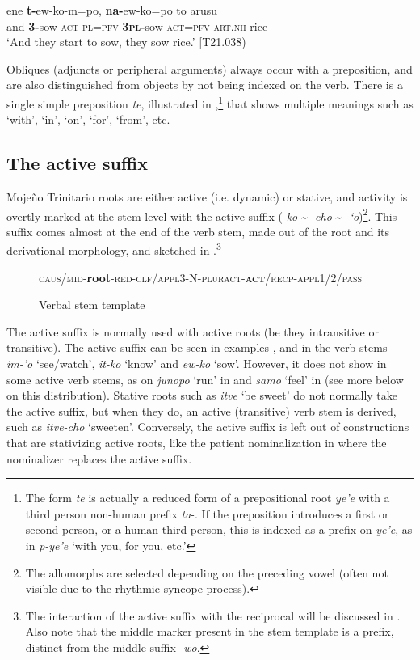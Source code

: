\documentclass[output=paper]{langscibook}
\begin{document}
\ea
\label{ex:Rose:6}
\gll ene \textbf{t-}ew-ko-m=po, \textbf{na-}ew-ko=po to arusu\\
and \textbf{3-}sow-\textsc{act-pl=pfv} \textbf{\textsc{3pl-}}sow-\textsc{act=pfv} \textsc{art.nh} rice\\
\glt ‘And they start to sow, they sow rice.’ [T21.038)
\z


Obliques (adjuncts or peripheral arguments) always occur with a preposition, and are also distinguished from objects by not being indexed on the verb. There is a single simple preposition \textit{te}, illustrated in ,\footnote{The form \textit{te} is actually a reduced form of a prepositional root \textit{ye’e} with a third person non-human prefix \textit{ta}-. If the preposition introduces a first or second person, or a human third person, this is indexed as a prefix on \textit{ye’e}, as in \textit{p-ye’e} ‘with you, for you, etc.’} that shows multiple meanings such as ‘with’, ‘in’, ‘on’, ‘for’, ‘from’, etc.


\subsection{The active suffix}
\label{sec:Rose:2.4}

Mojeño Trinitario roots are either active (i.e. dynamic) or stative, and activity is overtly marked at the stem level with the active suffix (-\textit{ko} {\textasciitilde} -\textit{cho} {\textasciitilde} \nobreakdash-\textit{`o})\footnote{The allomorphs are selected depending on the preceding vowel (often not visible due to the rhythmic syncope process).}. This suffix comes almost at the end of the verb stem, made out of the root and its derivational morphology, and sketched in .\footnote{\textrm{The interaction of the active suffix with the reciprocal will be discussed in . Also note that the middle marker present in the stem template is a prefix, distinct from the middle suffix -}\textrm{\textit{wo}}.}


\begin{figure}
\caption{\label{fig:Rose:2}Verbal stem template}

\textsc{caus/mid}-\textbf{root}-\textsc{red-clf/appl3-}N\textsc{-pluract-}\textbf{\textsc{act}}\textsc{/recp-appl1/2/pass}
\end{figure}

The active suffix is normally used with active roots (be they intransitive or transitive). The active suffix can be seen in examples ,  and  in the verb stems \textit{im-'o} ‘see/watch’, \textit{it-ko} ‘know’ and \textit{ew-ko} ‘sow’. However, it does not show in some active verb stems, as on \textit{junopo} ‘run’ in  and \textit{samo} ‘feel’ in  (see more below on this distribution). Stative roots such as \textit{itve} ‘be sweet’ do not normally take the active suffix, but when they do, an active (transitive) verb stem is derived, such as \textit{itve-cho} ‘sweeten’. Conversely, the active suffix is left out of constructions that are stativizing active roots, like the patient nominalization in  where the nominalizer replaces the active suffix.
\end{document}

